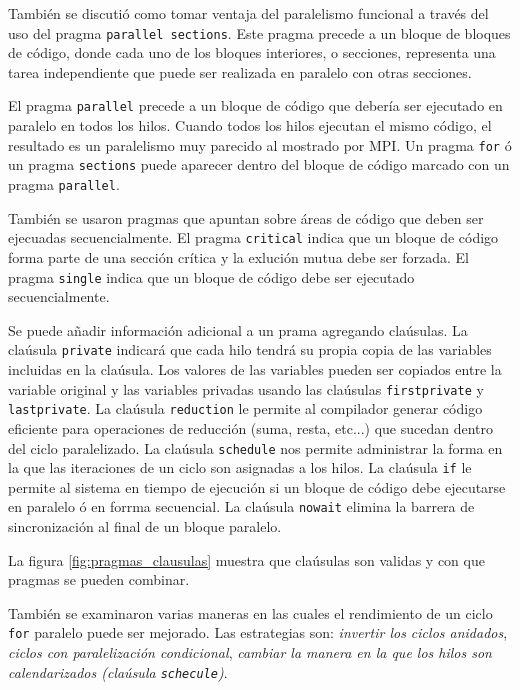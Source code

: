 \documentclass[12pt,letterpaper]{book}
\begin{document}
También se discutió como tomar ventaja del paralelismo funcional a través del uso del pragma \texttt{parallel sections}. Este pragma precede a un bloque de bloques de código, donde cada uno de los bloques interiores, o secciones, representa una tarea independiente que puede ser realizada en paralelo con otras secciones.

El pragma \texttt{parallel} precede a un bloque de código que debería ser ejecutado en paralelo en todos los hilos. Cuando todos los hilos ejecutan el mismo código, el resultado es un paralelismo muy parecido al mostrado por MPI. Un pragma \texttt{for} ó un pragma \texttt{sections} puede aparecer dentro del bloque de código marcado con un pragma \texttt{parallel}.

También se usaron pragmas que apuntan sobre áreas de código que deben ser ejecuadas secuencialmente. El pragma \texttt{critical} indica que un bloque de código forma parte de una sección crítica y la exlución mutua debe ser forzada. El pragma \texttt{single} indica que un bloque de código debe ser ejecutado secuencialmente.

Se puede añadir información adicional a un prama agregando claúsulas. La claúsula \texttt{private} indicará que cada hilo tendrá su propia copia de las variables incluidas en la claúsula. Los valores de las variables pueden ser copiados entre la variable original y las variables privadas usando las claúsulas \texttt{firstprivate} y \texttt{lastprivate}. La claúsula \texttt{reduction} le permite al compilador generar código eficiente para operaciones de reducción (suma, resta, etc...) que sucedan dentro del ciclo paralelizado. La claúsula \texttt{schedule} nos permite administrar la forma en la que las iteraciones de un ciclo son asignadas a los hilos. La claúsula \texttt{if} le permite al sistema en tiempo de ejecución si un bloque de código debe ejecutarse en paralelo ó en forrma secuencial. La claúsula \texttt{nowait} elimina la barrera de sincronización al final de un bloque paralelo.

La figura \ref{fig:pragmas_clausulas} muestra que claúsulas son validas y con que pragmas se pueden combinar.

También se examinaron varias maneras en las cuales el rendimiento de un ciclo \texttt{for} paralelo puede ser mejorado. Las estrategias son: \textit{invertir los ciclos anidados}, \textit{ciclos con paralelización condicional}, \textit{cambiar la manera en la que los hilos son calendarizados (claúsula \texttt{schecule})}.
\end{document}
